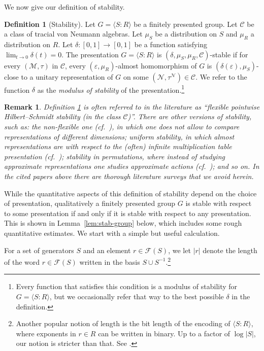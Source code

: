\documentclass[11pt]{article}
\newtheorem{remark}[theorem]{Remark}
\theoremstyle{definition}
\newtheorem{definition}[theorem]{Definition}
\newcommand{\mC}{\ensuremath{\mathcal{C}}}
\newcommand{\mF}{\ensuremath{\mathcal{F}}}
\newcommand{\cM}{\ensuremath{\mathcal{M}}}
\newcommand{\eps}{\varepsilon}
\newcommand{\mN}{\mathcal{N}}
\begin{document}
We now give our definition of stability.

\begin{definition}[Stability]\label{def:eff-stab}
Let $G = \langle S:R\rangle $ be a finitely presented group. Let $\mC$ be a class of tracial von Neumann algebras. Let $\mu_S$ be a distribution on $S$ and $\mu_R$ a distribution on $R$. Let $\delta:[0,1]\to[0,1]$ be a function satisfying $\lim_{t\to 0}\delta(t)=0$. The presentation $G=\langle S:R\rangle$ is $(\delta,\mu_S,\mu_R,\mC)$-stable if for every $(\cM,\tau)$ in $\mC$, every $(\eps,\mu_R)$-almost homomorphism of $G$ is $(\delta(\eps),\mu_S)$-close to a unitary representation of $G$ on some $(\mN,\tau^\mN)\in \mC$. We refer to the function $\delta$ as the \emph{modulus of stability} of the presentation.\footnote{Every function that satisfies this condition is a modulus of stability for $G=\langle S\colon R\rangle$, but we occasionally refer that way to the best possible $\delta$ in the definition.} 
\end{definition}

\begin{remark}
    Definition \ref{def:eff-stab} is often referred to in the literature as ``flexible pointwise Hilbert--Schmidt stability (in the class $\mC$)''. There are other versions of stability, such as: the non-flexible one (cf.\ \cite{becker2019stability, hadwin2018stability}), in which one does not allow to compare representations of different dimensions; uniform stability, in which almost representations are with respect to  the (often) infinite multiplication table presentation (cf.\ \cite{kazhdan1982e,becker2022stability}); stability in permutations, where instead of studying approximate representations one studies approximate actions (cf.\ \cite{becker2019stability,becker2020group, ioana2020stability}); and so on. In the cited papers above there are thorough literature surveys that we avoid herein.
\end{remark}

While the quantitative aspects of this definition of stability depend on the choice of presentation, qualitatively a finitely presented group $G$ is stable with respect to some presentation if and only if it is stable with respect to any presentation. This is shown in Lemma~\ref{lem:stab-group} below, which includes some rough quantitative estimates. We start with a simple but useful calculation.

For a set of generators $S$ and an element $r\in\mF(S)$, we let $|r|$ denote the length of the word $r\in \mF(S)$ written in the basis $S\cup S^{-1}$.\footnote{Another popular notion of length is the bit length of the encoding of $\langle S\colon R\rangle$, where exponents in $r\in R$ can be written in binary. Up to a factor of $\log |S|$, our notion is stricter than that. See \cite{babai1997short}.}
\end{document}
